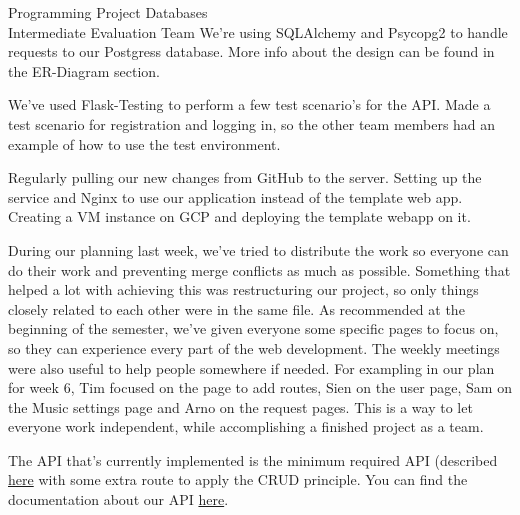 \documentclass{article}
\newcounter{team}
\begin{document}
\begin{Minutes}{Programming Project Databases \\ Intermediate Evaluation Team }
    	    We're using SQLAlchemy and Psycopg2 to handle requests to our Postgress database. More info about the design can be found in the ER-Diagram section.

    	    We've used Flask-Testing to perform a few test scenario's for the API.
    	        Made a test scenario for registration and logging in, so the other team members had an example of how to use the test environment.

    	        Regularly pulling our new changes from GitHub to the server.
    	        Setting up the service and Nginx to use our application instead of the template web app.
    	        Creating a VM instance on GCP and deploying the template webapp on it.

    	During our planning last week, we've tried to distribute the work so everyone can do their work and preventing merge conflicts as much as possible. Something that helped a lot with achieving this was restructuring our project, so only things closely related to each other were in the same file. As recommended at the beginning of the semester, we've given everyone some specific pages to focus on, so they can experience every part of the web development. The weekly meetings were also useful to help people somewhere if needed. For exampling in our plan for week 6, Tim focused on the page to add routes, Sien on the user page, Sam on the Music settings page and Arno on the request pages. This is a way to let everyone work independent, while accomplishing a finished project as a team.

    	The API that's currently implemented is the minimum required API (described \href{https://ppdb.docs.apiary.io/}{here} with some extra route to apply the CRUD principle. You can find the documentation about our API \href{https://placeholder.docs.apiary.io/}{here}.


\end{Minutes}
\end{document}
